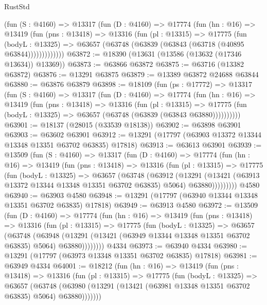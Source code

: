\begin{lexlean}{RustStd}
\begin{coremodule}
        (fun (S : @4160) =>
        @13317
          (fun (D : @4160) =>
          @17774
            (fun (hn : @16) =>
            @13419
              (fun (pns : @13418) =>
              @13316
                (fun (pl : @13315) =>
                @17775
                  (fun (bodyL : @13325) =>
                  @63657 (@63748 (@63839 (@63843 (@63718 (@40895 @63844)))))))))))))
@63872 := @18390 (@13631 (@13586 (@13632 (@17346 @13634)) @13369))
@63873 := @63866 @63872
@63875 := @63716 (@13382 @63872)
@63876 := @13291 @63875
@63879 := @13389 @63872 @24688 @63844
@63880 := @63876 @63879
@63898 := @18109
    (fun (ps : @17772) =>
    @13317
      (fun (S : @4160) =>
      @13317
        (fun (D : @4160) =>
        @17774
          (fun (hn : @16) =>
          @13419
            (fun (pns : @13418) =>
            @13316
              (fun (pl : @13315) =>
              @17775 (fun (bodyL : @13325) => @63657 (@63748 (@63839 (@63843 @63880))))))))))
@63901 := @18137 (@28015 (@33539 @18138))
@63902 := @63898 @63901
@63903 := @63602 @63901
@63912 := @13291 (@17797 (@63903 @13372 @13344 @13348 @13351 @63702 @63835) @17818)
@63913 := @63613 @63901
@63939 := @13509
    (fun (S : @4160) =>
    @13317
      (fun (D : @4160) =>
      @17774
        (fun (hn : @16) =>
        @13419
          (fun (pns : @13418) =>
          @13316
            (fun (pl : @13315) =>
            @17775
              (fun (bodyL : @13325) =>
              @63657
                (@63748
                  (@63912
                    (@13291
                      (@13421 (@63913 @13372 @13344 @13348 @13351 @63702 @63835) @5064)
                      @63880)))))))))
    @4580
@63940 := @63903 @4580
@63948 := @13291 (@17797 (@63940 @13344 @13348 @13351 @63702 @63835) @17818)
@63949 := @63913 @4580
@63972 := @13509
    (fun (D : @4160) =>
    @17774
      (fun (hn : @16) =>
      @13419
        (fun (pns : @13418) =>
        @13316
          (fun (pl : @13315) =>
          @17775
            (fun (bodyL : @13325) =>
            @63657
              (@63748
                (@63948
                  (@13291 (@13421 (@63949 @13344 @13348 @13351 @63702 @63835) @5064) @63880))))))))
    @4334
@63973 := @63940 @4334
@63980 := @13291 (@17797 (@63973 @13348 @13351 @63702 @63835) @17818)
@63981 := @63949 @4334
@64001 := @18212
    (fun (hn : @16) =>
    @13419
      (fun (pns : @13418) =>
      @13316
        (fun (pl : @13315) =>
        @17775
          (fun (bodyL : @13325) =>
          @63657
            (@63748
              (@63980 (@13291 (@13421 (@63981 @13348 @13351 @63702 @63835) @5064) @63880)))))))

\end{coremodule}
\end{lexlean}

